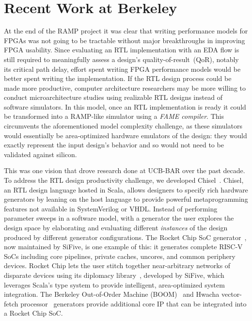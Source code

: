 \section{Recent Work at Berkeley}\label{sec:ucb-bar-recent-work}

At the end of the RAMP project it was clear that writing performance models for
FPGAs was not going to be tractable without major breakthroughs in improving
FPGA usability. Since evaluating an RTL implementation with an EDA flow is still
required to meaningfully assess a design's quality-of-result~(QoR), notably its critical path
delay, effort spent writing FPGA performance models would be better spent
writing the implementation. If the RTL design process could be made more productive,
computer architecture researchers may be more willing to conduct
microarchitecture studies using realizable RTL designs instead of software
simulators. In this model, once an RTL implementation is ready it could be
transformed into a RAMP-like simulator using a \emph{FAME compiler}. This circumvents the aforementioned model complexity challenge,
as these simulators would essentially be area-optimized hardware emulators of the design:
they would exactly represent the input design's behavior and so would not need
to be validated against silicon.

This was one vision that drove research done at UCB-BAR over the past decade.
To address the RTL design productivity challenge, we developed
Chisel~\cite{Chisel}. Chisel, an RTL design language hosted in Scala, allows
designers to specify rich hardware generators by leaning on the host language to provide
powerful metaprogramming features not available in SystemVerilog or VHDL.
Instead of performing parameter sweeps in a software model, with a generator
the user explores the design space by elaborating and evaluating different
\emph{instances} of the design produced by different generator configurations.
The Rocket Chip SoC generator~\cite{RocketChip}, now maintained by SiFive, is one example of this: it
generates complete RISC-V SoCs including
core pipelines, private caches, uncores, and common periphery devices. Rocket
Chip lets the user stitch together near-arbitrary networks of disparate devices
using its diplomacy library~\cite{Diplomacy}, developed by SiFive, which leverages Scala's type
system to provide intelligent, area-optimized system integration. The
Berkeley Out-of-Order Machine (BOOM)~\cite{BOOM} and Hwacha vector-fetch
processor~\cite{Hwacha} generators provide additional core IP that can be
integrated into a Rocket Chip SoC.

